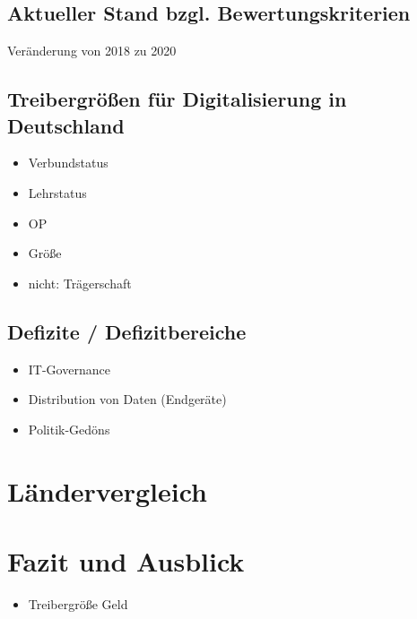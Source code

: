 	\subsection{Aktueller Stand bzgl. Bewertungskriterien}
		Veränderung von 2018 zu 2020
	\subsection{Treibergrößen für Digitalisierung in Deutschland}
	\begin{itemize}
		\item Verbundstatus \parencite{cresswell2013}
		\item Lehrstatus
		\item OP
		\item Größe \parencite{cresswell2013}
		\item nicht: Trägerschaft \parencite{cresswell2013}
	\end{itemize}
	\subsection{Defizite / Defizitbereiche}
	\begin{itemize}
		\item IT-Governance
		\item Distribution von Daten (Endgeräte)
		\item Politik-Gedöns
	\end{itemize}
\section{Ländervergleich} \label{sec:laendervergleich}

\section{Fazit und Ausblick}
\begin{itemize}
	\item Treibergröße Geld
\end{itemize}
\newpage
{}
\setcounter{page}{3}
\printbibliography
{}

